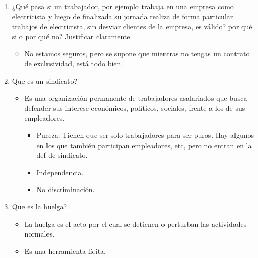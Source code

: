 \documentclass[spanish,12pt,a4paper,titlepage]{report}
\begin{document}
\begin{enumerate}
\begin{itemize}
  \item Dar trabajo cuando es esencial (por ejemplo a los destajistas\footnote{Que cobra por lo que se produce/cosecha}).
  \item Dar seguridad (casco, no hacerte laburar entre koreanos enojados, etc)
  \item Dar formación a los jóvenes.
  \item Descuentos para pensiones alimenticias.
  \item Proporcionar documentos (recibo d sueldo, constancia de trabajo, etc).
  \end{itemize}
\item ¿Qué pasa si un trabajador, por ejemplo trabaja en una empresa como electricista y luego de finalizada su jornada realiza de forma particular trabajos de electricista, sin desviar clientes de la empresa, es válido? por qué si o por qué no? Justificar claramente.
  \begin{itemize}
  \item No estamos seguros, pero se supone que mientras no tengas un contrato de exclusividad, está todo bien.
  \end{itemize}
\item Que es un sindicato?
  \begin{itemize}
  \item Es una organización permanente de trabajadores asalariados que busca defender sus interese económicos, políticos, sociales, frente a los de sus empleadores.
    \begin{itemize}
    \item Pureza: Tienen que ser solo trabajadores para ser puros. Hay algunos en los que también participan empleadores, etc, pero no entran en la def de sindicato.
    \item Independencia.
    \item No discriminación.
    \end{itemize}
  \end{itemize}
\item Que es la huelga?
  \begin{itemize}
  \item La huelga es el acto por el cual se detienen o perturban las actividades normales.
  \item Es una herramienta lícita.

\end{itemize}
\end{enumerate}
\end{document}
